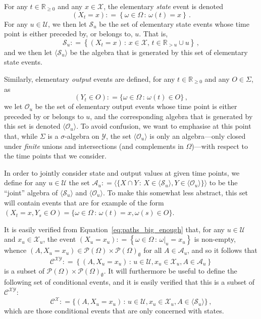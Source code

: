 \documentclass[twoside,11pt]{article}
\newcommand{\reals}{\mathbb{R}}
\newcommand{\realsnonneg}{\reals_{\geq 0}}
\newcommand{\states}{\mathcal{X}}
\newcommand{\observs}{\mathcal{Y}}
\newcommand{\coloneqq}{:\!=}
\begin{document}
For any $t\in\realsnonneg$ and any $x\in\states$, the elementary \emph{state} event is denoted
\begin{equation*}
(X_t=x) \coloneqq \left\{ \omega\in\Omega\,:\,\omega(t)=x \right\}\,.
\end{equation*}
For any $u\in\mathcal{U}$, we then let $\mathcal{S}_u$ be the set of elementary state events whose time point is either preceded by, or belongs to, $u$. That is,
\begin{equation*}
\mathcal{S}_u \coloneqq \left\{ (X_t=x)\,:\, x\in\states,\, t\in\reals_{>u}\cup u \right\}\,,
\end{equation*}
and we then let $\langle\mathcal{S}_u\rangle$ be the algebra that is generated by this set of elementary state events.

Similarly, elementary \emph{output} events are defined, for any $t\in\realsnonneg$ and any $O\in\Sigma$, as
\begin{equation*}
(Y_t \in O) \coloneqq \{ \omega\in\Omega\,:\,\omega(t)\in O \}\,,
\end{equation*}
we let $\mathcal{O}_u$ be the set of elementary output events whose time point is either preceded by or belongs to $u$, and the corresponding algebra that is generated by this set is denoted $\langle\mathcal{O}_u\rangle$. To avoid confusion, we want to emphasise at this point that, while $\Sigma$ is a $\sigma$-algebra on $\observs$, the set $\langle \mathcal{O}_u\rangle$ is only an algebra---only closed under \emph{finite} unions and intersections (and complements in $\Omega$)---with respect to the time points that we consider. 

In order to jointly consider state and output values at given time points, we define for any $u\in\mathcal{U}$ the set $\mathcal{A}_u\coloneqq \langle \{ X\cap Y\,:\,X\in\langle\mathcal{S}_u\rangle, Y\in\langle\mathcal{O}_u\rangle\} \rangle$ to be the ``joint'' algebra of $\langle\mathcal{S}_u\rangle$ and $\langle\mathcal{O}_u\rangle$. To make this somewhat less abstract, this set will contain events that are for example of the form $(X_t=x, Y_s\in O)=\{\omega\in\Omega\,:\,\omega(t)=x,\omega(s)\in O\}$.

It is easily verified from Equation~\eqref{eq:paths_big_enough} that, for any $u\in\mathcal{U}$ and $x_u\in\states_u$, the event $(X_u=x_u)\coloneqq\left\{\omega\in\Omega\,:\,\omega\vert_u=x_u\right\}$ is non-empty, whence $(A,X_u=x_u)\in \mathcal{P}(\Omega)\times \mathcal{P}(\Omega)_\emptyset$ for all $A\in\mathcal{A}_u$, and so it follows that
\begin{equation*}
\mathcal{C}^{\states\observs} \coloneqq \left\{ (A, X_u=x_u)\,:\, u\in\mathcal{U}, x_u\in\states_u, A\in\mathcal{A}_u \right\}
\end{equation*}
is a subset of $\mathcal{P}(\Omega)\times \mathcal{P}(\Omega)_\emptyset$. It will furthermore be useful to define the following set of conditional events, and it is easily verified that this is a subset of $\mathcal{C}^{\states\observs}$:
\begin{equation*}
\mathcal{C}^{\states} \coloneqq \{(A,X_u=x_u)\,:\,u\in\mathcal{U},x_u\in\states_u,A\in\langle\mathcal{S}_u\rangle\}\,,
\end{equation*}
which are those conditional events that are only concerned with states.
\end{document}
